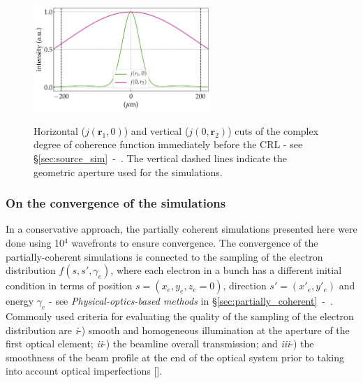 \begin{refsection}
\begin{figure}[t]
        \centering
        {\includegraphics[height=4cm]{figures/ch05/source/CdoC.pdf}}
        \caption[Complex degree of coherence]{Horizontal ($j(\textbf{r}_1,0)$) and vertical ($j(0,\textbf{r}_2)$) cuts of the complex degree of coherence function immediately before the CRL - see \S\ref{sec:source_sim}~-~\textit{}. The vertical dashed lines indicate the geometric aperture used for the simulations. 
        }\label{fig:CDoC}
\end{figure}
\subsubsection*{On the convergence of the simulations}
In a conservative approach, the partially coherent simulations presented here were done using 10$^{4}$ wavefronts to ensure convergence.
The convergence of the partially-coherent simulations is connected to the sampling of the electron distribution $f(s,s',\gamma_e)$, where each electron in a bunch has a different initial condition in terms of position $s=(x_e,y_e,z_e=0)$, direction $s'=(x'_e,y'_e)$ and energy $\gamma_e$ - see \textit{Physical-optics-based methods} in \S\ref{sec:partially_coherent}~-~\textit{}. Commonly used criteria for evaluating the quality of the sampling of the electron distribution are \textit{i}-) smooth and homogeneous illumination at the aperture of the first optical element;  \textit{ii}-) the beamline overall transmission; and \textit{iii}-) the smoothness of the beam profile at the end of the optical system prior to taking into account optical imperfections [\cite{SanchezdelRio2019}].%


\end{refsection}

